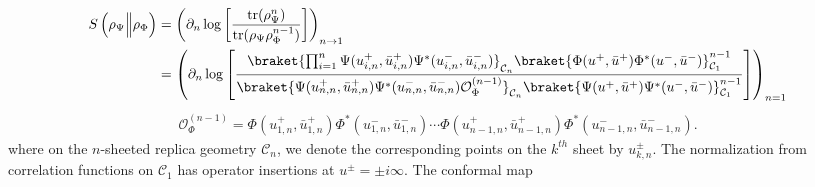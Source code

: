 \documentclass[11pt]{article}
\newcommand{\p}{\partial}
\newcommand{\mO}{\mathcal{O}}
\newcommand{\nn}{\nonumber}
\newcommand{\lb}{\left(}
\newcommand{\rb}{\right)}
\newcommand{\JM}[1]{\textcolor{orange}{#1}}
\begin{document}
\begin{align}\label{relEntropyReplica}
    S\left(\rho_\Psi \Big\| \rho_\Phi\right)&=\lb \partial_{n}
    \log \left[ \frac{\text{tr}(\rho_{\Psi}^{n})}{\text{tr}(\rho_{\Psi}\rho_{\Phi}^{n-1})}
    \right]\rb_{n\to 1}\nn\\
    &=\lb
    \p_n\log\left[
    \frac{\braket{\prod_{i=1}^{n} \Psi(u^+_{i,n}, \bar u_{i,n}^+)\Psi^*(u^-_{i,n},\bar u_{i,n}^-)}_{\mathcal{C}_n}\braket{\Phi(u^+,\bar u^+)\Phi^*(u^-,\bar u^-)}_{\mathcal{C}_1}^{n-1}}{\braket{\Psi(u^+_{n,n}, \bar u_{n,n}^+)\Psi^*(u^-_{n,n},\bar u_{n,n}^-)\mO^{(n-1)}_{\Phi}}_{\mathcal{C}_n}\braket{\Psi(u^+,\bar u^+)\Psi^*(u^-,\bar u^-)}_{\mathcal{C}_1}^{n-1}}\right]
    \rb_{n=1}
  \end{align}
  \begin{eqnarray}\label{corrFncyl}
    \mO_{\Phi}^{(n-1)}=
    \Phi(u_{1,n}^+,\bar u_{1,n}^+)\Phi^*(u_{1,n}^-, \bar u_{1,n}^-)\cdots \Phi(u_{n-1,n}^+,\bar u_{n-1,n}^+)\Phi^*(u_{n-1,n}^-,\bar u_{n-1,n}^-).
  \end{eqnarray}
  where on the $n$-sheeted replica
geometry $\mathcal C_n$, we denote the corresponding points on the
$k^{th}$ sheet by $u_{k,n}^{\pm}$. The normalization from correlation functions on $\mathcal{C}_1$ has operator insertions at $u^\pm = \pm i\infty$.
   The conformal map \cite{Lashkari_2016}
\end{document}
